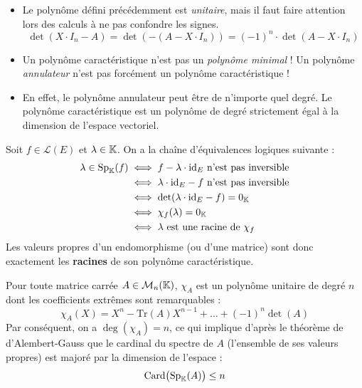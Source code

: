 \documentclass[12pt, a4paper]{report}
\begin{document}
\begin{attention}
    \begin{itemize}
        \item Le polynôme défini précédemment est \textit{unitaire}, mais il faut faire attention lors des calculs à ne pas confondre les signes.
        $$\det(X \cdot I_n - A) = \det(-(A - X \cdot I_n)) = (-1)^n \cdot \det(A - X \cdot I_n)$$

        \item Un polynôme caractéristique n'est pas un \textit{polynôme minimal} ! Un polynôme \textit{annulateur} n'est pas forcément un polynôme caractéristique !
        
        \item En effet, le polynôme annulateur peut être de n'importe quel degré. Le polynôme caractéristique est un polynôme de degré strictement égal à la dimension de l'espace vectoriel.
    \end{itemize}
\end{attention}

\begin{remark}
    Soit $f \in \mathcal{L}(E)$ et $\lambda \in \mathbb{K}$. On a la chaîne d'équivalences logiques suivante :
    \begin{align*}
        \lambda \in \text{Sp}_{\mathbb{K}}(f) &\iff f - \lambda \cdot \mathrm{id}_E \text{ n'est pas inversible} \\
        &\iff \lambda \cdot \mathrm{id}_E - f \text{ n'est pas inversible} \\
        &\iff \det(\lambda \cdot \mathrm{id}_E - f) = 0_{\mathbb{K}} \\
        &\iff \chi_f(\lambda) = 0_{\mathbb{K}} \\
        &\iff \lambda \text{ est une racine de } \chi_f
    \end{align*}
    Les valeurs propres d'un endomorphisme (ou d'une matrice) sont donc exactement les \textbf{racines} de son polynôme caractéristique.
\end{remark}

\begin{remark}
    Pour toute matrice carrée $A \in \mathcal{M}_n(\mathbb{K})$, $\chi_A$ est un polynôme unitaire de degré $n$ dont les coefficients extrêmes sont remarquables :
    $$\chi_A(X) = X^n - \text{Tr}(A)X^{n-1} + \dots + (-1)^n \det(A)$$
    Par conséquent, on a $\deg(\chi_A) = n$, ce qui implique d'après le théorème de d'Alembert-Gauss que le cardinal du spectre de $A$ (l'ensemble de ses valeurs propres) est majoré par la dimension de l'espace :
    $$\text{Card}\bigl(\text{Sp}_{\mathbb{K}}(A)\bigr) \le n$$
\end{remark}
\end{document}
